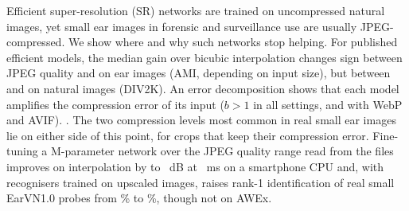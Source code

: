 Efficient super-resolution (SR) networks are trained on uncompressed natural images, yet small ear images in forensic and surveillance use are usually JPEG-compressed. We show where and why such networks stop helping. For \NPub{} published efficient models, the median gain over bicubic interpolation changes sign between JPEG quality \CrossGridAmiLo{} and \CrossGridAmiHi{} on ear images (AMI, depending on input size), but between \CrossGridNatLo{} and \CrossGridNatHi{} on natural images (DIV2K). An error decomposition shows that each model amplifies the compression error of its input ($b>1$ in all \RatioCells{} settings, and with WebP and AVIF). \KeyFinding. The two compression levels most common in real small ear images lie on either side of this point, for crops that keep their compression error. Fine-tuning a \ParamsSpan{}M-parameter network over the JPEG quality range read from the files improves on interpolation by \EstVsBicMin{} to \EstVsBicMax{}~dB at \LatPhoneSpanCpu{}~ms on a smartphone CPU and, with recognisers trained on upscaled images, raises rank-1 identification of real small EarVN1.0 probes from \RecUpEarvnBic{}\% to \RecUpEarvnEst{}\%, though not on AWEx.
